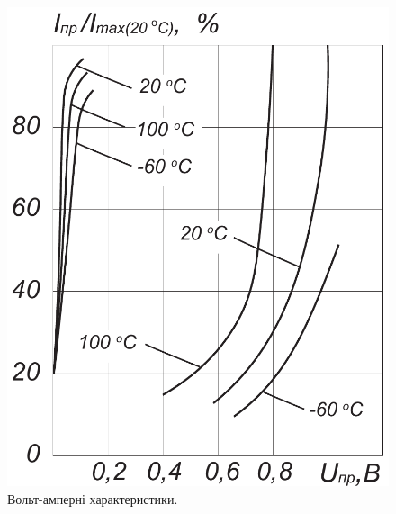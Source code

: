 \documentclass[a4paper,14pt]{extreport}
\begin{document}
\begin{figure}[h!]\label{im9}
  \begin{minipage}[h]{0.5\linewidth}
    \includegraphics[width=1\linewidth]{1.5.6.pdf}
    \caption{Вольт-амперні характеристики.}
  \end{minipage}
\hfill
  \begin{minipage}[h]{0.43\linewidth}

\end{minipage}
\end{figure}
\end{document}
